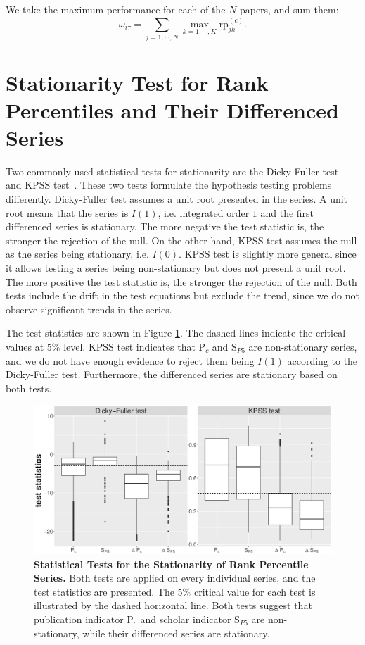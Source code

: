 \begin{refsection}
We take the maximum performance for each of the $N$ papers, and sum them:
\begin{equation}
    \omega_{i \tau} = \sum_{j=1,\cdots,N} \max_{k=1,\cdots, K} \text{rp}_{j k} ^{(c)}.
\end{equation}
\fi

\section{Stationarity Test for Rank Percentiles and Their Differenced Series}
\label{sec:suppl_stationarity}

Two commonly used statistical tests for stationarity are the Dicky-Fuller test~\cite{dickey1979distribution} and KPSS test~\cite{kwiatkowski1992testing}. These two tests formulate the hypothesis testing problems differently. Dicky-Fuller test assumes a unit root presented in the series. A unit root means that the series is $I(1)$, i.e. integrated order $1$ and the first differenced series is stationary. The more negative the test statistic is, the stronger the rejection of the null. On the other hand, KPSS test assumes the null as the series being stationary, i.e. $I(0)$. KPSS test is slightly more general since it allows testing a series being non-stationary but does not present a unit root. The more positive the test statistic is, the stronger the rejection of the null. Both tests include the drift in the test equations but exclude the trend, since we do not observe significant trends in the series. 

The test statistics are shown in Figure \ref{fig:stationarity_test}. The dashed lines indicate the critical values at $5 \%$ level. KPSS test indicates that P$_c$ and S$_{P5}$ are non-stationary series, and we do not have enough evidence to reject them being $I(1)$ according to the Dicky-Fuller test. Furthermore, the differenced series are stationary based on both tests.


\begin{figure}[ht!]
    \centering
    \includegraphics[width=\textwidth]{figures/stationarity/df_kpss.eps}
    \caption{{\bf Statistical Tests for the Stationarity of Rank Percentile Series.}
    Both tests are applied on every individual series, and the test statistics are presented. The $5\%$ critical value for each test is illustrated by the dashed horizontal line. Both tests suggest that publication indicator P$_c$ and scholar indicator S$_{P5}$ are non-stationary, while their differenced series are stationary. }
    \label{fig:stationarity_test}
\end{figure}


\end{refsection}
